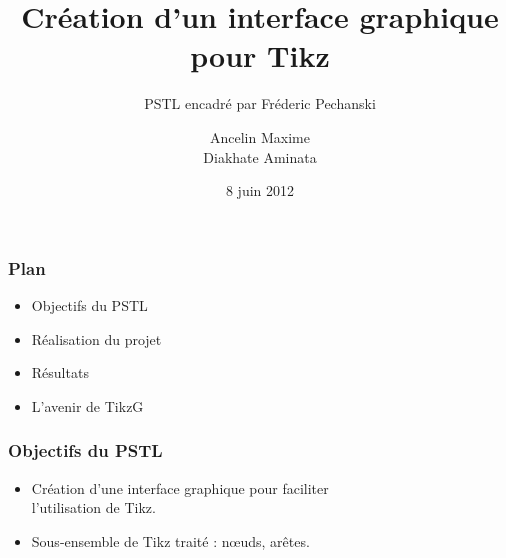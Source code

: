\documentclass{beamer}
\title[Création d'un interface graphique pour Tikz]{Création d'un interface graphique pour Tikz}
\subtitle{PSTL encadré par Fréderic Pechanski}    %
\author[]{Ancelin Maxime\\Diakhate Aminata}                 %
\institute[UPMC]{M1 Informatique spécialité STL\\UPMC}      %
\date{8 juin 2012}      %
\begin{document}
\newenvironment{violetpar}{\color{violet}}{}
\newenvironment{bluepar}{\par\color{blue}}{\par}
\newenvironment{yellowpar}{\par\color{orange}}{\par}





\begin{frame}
  \titlepage
\end{frame}

\begin{frame}
\frametitle{Plan} 

\begin{itemize}

\item Objectifs du PSTL

\item Réalisation du projet

\item Résultats

\item L'avenir de TikzG

%


\end{itemize}
\end{frame}

\begin{frame}
\frametitle{Objectifs du PSTL} 


\begin{itemize}

\item Création d'une interface graphique pour
faciliter\\ l'utilisation de Tikz.

\item Sous-ensemble de Tikz traité : nœuds,
arêtes.

\end{itemize}
\end{frame}
\end{document}
